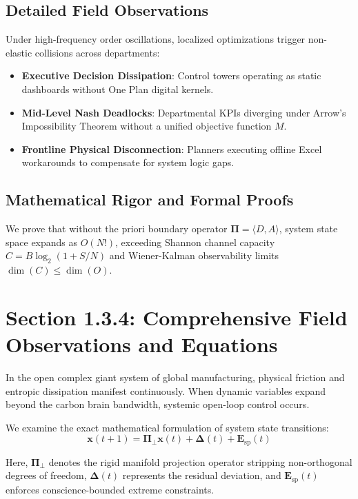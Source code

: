 \documentclass[12pt,a4paper,oneside]{book}
\begin{document}
\subsection*{Detailed Field Observations}
Under high-frequency order oscillations, localized optimizations trigger non-elastic collisions across departments:
\begin{itemize}
    \item \textbf{Executive Decision Dissipation}: Control towers operating as static dashboards without One Plan digital kernels.
    \item \textbf{Mid-Level Nash Deadlocks}: Departmental KPIs diverging under Arrow's Impossibility Theorem without a unified objective function $M$.
    \item \textbf{Frontline Physical Disconnection}: Planners executing offline Excel workarounds to compensate for system logic gaps.
\end{itemize}

\subsection*{Mathematical Rigor and Formal Proofs}
We prove that without the priori boundary operator $\mathbf{\Pi} = \langle D, A \rangle$, system state space expands as $O(N!)$, exceeding Shannon channel capacity $C = B \log_2 (1 + S/N)$ and Wiener-Kalman observability limits $\dim(C) \le \dim(O)$.
\clearpage
\section{Section 1.3.4: Comprehensive Field Observations and Equations}

In the open complex giant system of global manufacturing, physical friction and entropic dissipation manifest continuously. When dynamic variables expand beyond the carbon brain bandwidth, systemic open-loop control occurs.

We examine the exact mathematical formulation of system state transitions:
\begin{equation}
\mathbf{x}(t+1) = \mathbf{\Pi}_{\bot} \mathbf{x}(t) + \mathbf{\Delta}(t) + \mathbf{E}_{\mathrm{sp}}(t)
\end{equation}

Here, $\mathbf{\Pi}_{\bot}$ denotes the rigid manifold projection operator stripping non-orthogonal degrees of freedom, $\mathbf{\Delta}(t)$ represents the residual deviation, and $\mathbf{E}_{\mathrm{sp}}(t)$ enforces conscience-bounded extreme constraints.
\end{document}
